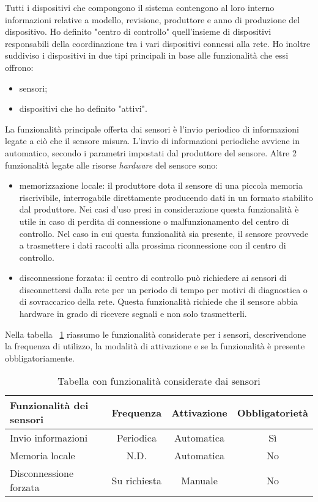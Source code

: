 Tutti i dispositivi che compongono il sistema contengono al loro interno informazioni relative a modello, revisione, produttore e anno di produzione del dispositivo.
Ho definito "centro di controllo" quell'insieme di dispositivi responsabili della coordinazione tra i vari dispositivi connessi alla rete.
Ho inoltre suddiviso i dispositivi in due tipi principali in base alle funzionalità che essi offrono:
\begin{itemize}
	\item sensori;
	\item dispositivi che ho definito "attivi".
\end{itemize}
La funzionalità principale offerta dai sensori è l'invio periodico di informazioni legate a ciò che il sensore misura.
L'invio di informazioni periodiche avviene in automatico, secondo i parametri impostati dal produttore del sensore.
Altre 2 funzionalità legate alle risorse \emph{hardware} del sensore sono:
\begin{itemize}
	\item memorizzazione locale: il produttore dota il sensore di una piccola memoria riscrivibile, interrogabile direttamente producendo dati in un formato stabilito dal produttore. Nei casi d'uso presi in considerazione questa funzionalità è utile in caso di perdita di connessione o malfunzionamento del centro di controllo. Nel caso in cui questa funzionalità sia presente, il sensore provvede a trasmettere i dati raccolti alla prossima riconnessione con il centro di controllo.
	\item disconnessione forzata: il centro di controllo può richiedere ai sensori di disconnettersi dalla rete per un periodo di tempo per motivi di diagnostica o di sovraccarico della rete. Questa funzionalità richiede che il sensore abbia hardware in grado di ricevere segnali e non solo trasmetterli.
\end{itemize}

Nella tabella ~\ref{tab:funz-sensori} riassumo le funzionalità considerate per i sensori, descrivendone la frequenza di utilizzo, la modalità di attivazione e se la funzionalità è presente obbligatoriamente.

\begin{table}[H]
\caption{Tabella con funzionalità considerate dai sensori}
\label{tab:funz-sensori}
\begin{tabularx}{\linewidth}{|X|c|c|c|}
\hline
\textbf{Funzionalità dei sensori} & \textbf{Frequenza} & \textbf{Attivazione} & \textbf{Obbligatorietà} \\
\hline
Invio informazioni & Periodica & Automatica & Sì \\
\hline
Memoria locale & N.D. & Automatica & No \\
\hline
Disconnessione forzata & Su richiesta & Manuale & No \\
\hline
\end{tabularx}
\end{table}

